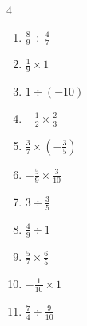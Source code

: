 \begin{multicols}{4}
\begin{enumerate}

  \item $\displaystyle \frac{8}{9}\div{}\frac{4}{7}$


\columnbreak %

\resetques

  \item $\displaystyle \frac{1}{9}\times{}1$


  \item $\displaystyle 1\div{}\left(-10\right)$


  \item $\displaystyle -\frac{1}{2}\times{}\frac{2}{3}$


  \item $\displaystyle \frac{3}{7}\times{}\left(-\frac{3}{5}\right)$


  \item $\displaystyle -\frac{5}{9}\times{}\frac{3}{10}$


  \item $\displaystyle 3\div{}\frac{3}{5}$

        \phantom{$\displaystyle =5$}

  \item $\displaystyle \frac{4}{9}\div{}1$


  \item $\displaystyle \frac{5}{7}\times{}\frac{6}{5}$


  \item $\displaystyle -\frac{1}{10}\times{}1$


  \item $\displaystyle \frac{7}{4}\div{}\frac{9}{10}$



\end{enumerate}
\end{multicols}
